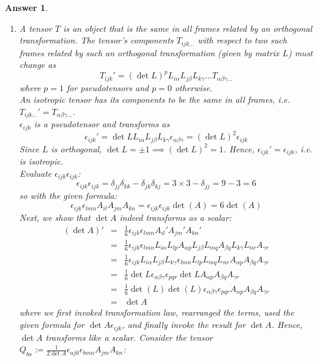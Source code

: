 \documentclass[a4paper]{article}
\newtheorem{ans}{Answer}[section]
\theoremstyle{new}
\begin{document}
\begin{ans}\leavevmode
\begin{enumerate}[label=(\roman*)]
\item A tensor $T$ is an object that is the same in all frames related by an orthogonal transformation. The tensor's components $T_{ijk...}$ with respect to two such frames related by such an orthogonal transformation (given by matrix $L$) must change as 
$$T_{ijk}'=(\det L)^pL_{i\alpha}L_{j\beta}L_{k\gamma}...T_{\alpha\beta\gamma...}$$
where $p=1$ for pseudotensors and $p=0$ otherwise.\\[5pt]
An isotropic tensor has its components to be the same in all frames, i.e. $T_{ijk...}'=T_{\alpha\beta\gamma...}$.\\[5pt]
$\epsilon_{ijk}$ is a pseudotensor and transforms as
$$\epsilon_{ijk}'=\det L L_{i\alpha}L_{j\beta}L_{k\gamma}\epsilon_{\alpha\beta\gamma}=(\det L)^2\epsilon_{ijk}$$
Since $L$ is orthogonal, $\det L=\pm1\implies(\det L)^2=1$. Hence, $\epsilon_{ijk}'=\epsilon_{ijk}$, i.e. is isotropic.\\[5pt]
Evaluate $\epsilon_{ijk}\epsilon_{ijk}$:
$$\epsilon_{ijk}\epsilon_{ijk}=\delta_{jj}\delta_{kk}-\delta_{jk}\delta_{kj}=3\times 3-\delta_{jj}=9-3=6$$
so with the given formula:
$$\epsilon_{ijk}\epsilon_{lmn}A_{il}A_{jm}A_{kn}=\epsilon_{ijk}\epsilon_{ijk}\det(A)=6\det (A)$$
Next, we show that $\det A$ indeed transforms as a scalar:
\begin{eqnarray}
(\det A)'&=&\frac{1}{6}\epsilon_{ijk}\epsilon_{lmn}A_{il}'A_{jm}'A_{kn}'\nonumber\\&=&\frac{1}{6}\epsilon_{ijk}\epsilon_{lmn}L_{i\alpha}L_{lp}A_{\alpha p}L_{j\beta}L_{mq}A_{\beta q}L_{k\gamma}L_{nr}A_{\gamma r}\nonumber\\&=&\frac{1}{6}\epsilon_{ijk}L_{i\alpha}L_{j\beta}L_{k\gamma}\epsilon_{lmn}L_{lp}L_{mq}L_{nr}A_{\alpha p}A_{\beta q}A_{\gamma r}\nonumber\\&=&\frac{1}{6}\det L\epsilon_{\alpha\beta\gamma}\epsilon_{pqr}\det LA_{\alpha p}A_{\beta q}A_{\gamma r}\nonumber\\&=&\frac{1}{6}\det(L)\det(L)\epsilon_{\alpha\beta\gamma}\epsilon_{pqr}A_{\alpha p}A_{\beta q}A_{\gamma r}\nonumber\\&=&\det A \nonumber
\end{eqnarray}
where we first invoked transformation law, rearranged the terms, used the given formula for $\det A\epsilon_{ijk}$, and finally invoke the result for $\det A$. Hence, $\det A$ transforms like a scalar. Consider the tensor $Q_{ba}:=\frac{1}{2\det A}\epsilon_{ajk}\epsilon_{bmn}A_{jm}A_{kn}$:

\end{enumerate}
\end{ans}
\end{document}
